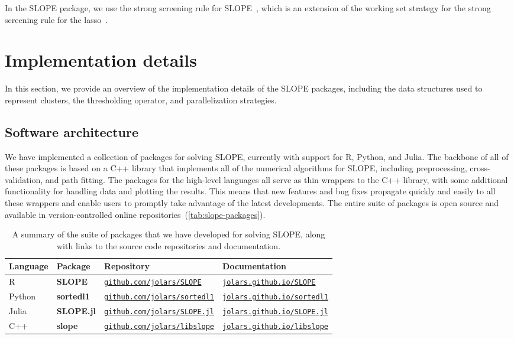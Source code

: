 \documentclass[a4paper,fleqn]{cas-sc}
\newcommand{\myurl}[1]{\href{https://#1}{\nolinkurl{#1}}}
\begin{document}
In the SLOPE package, we use the strong screening rule for
SLOPE~\citep{larsson2020a}, which is an extension of the working set strategy
for the strong screening rule for the lasso~\citep{tibshirani2012}.

\section{Implementation details}
\label{sec:implementation-details}

In this section, we provide an overview of the implementation details of the
SLOPE packages, including the data structures used to represent clusters, the
thresholding operator, and parallelization strategies.

\subsection{Software architecture}

We have implemented a collection of packages for solving SLOPE, currently with
support for \textsf{R}, \textsf{Python}, and \textsf{Julia}. The backbone of all
of these packages is based on a \textsf{C++} library that implements all of the
numerical algorithms for SLOPE, including preprocessing, cross-validation, and
path fitting. The packages for the high-level languages all serve as thin
wrappers to the \textsf{C++} library, with some additional functionality for
handling data and plotting the results. This means that new features and bug
fixes propagate quickly and easily to all these wrappers and enable users to
promptly take advantage of the latest developments. The entire suite of packages
is open source and available in version-controlled online
repositories~(\autoref{tab:slope-packages}).

\begin{table}[pos=tp]
  \caption{
    A summary of the suite of packages that we have developed for solving SLOPE,
    along with links to the source code repositories and documentation.
  }
  \label{tab:slope-packages}
  \centering
  \begin{tabular}{llll}
    \toprule
    Language        & Package           & Repository                         & Documentation                     \\
    \midrule
    \textsf{R}      & \textbf{SLOPE}    & \myurl{github.com/jolars/SLOPE}    & \myurl{jolars.github.io/SLOPE}    \\
    \textsf{Python} & \textbf{sortedl1} & \myurl{github.com/jolars/sortedl1} & \myurl{jolars.github.io/sortedl1} \\
    \textsf{Julia}  & \textbf{SLOPE.jl} & \myurl{github.com/jolars/SLOPE.jl} & \myurl{jolars.github.io/SLOPE.jl} \\
    \textsf{C++}    & \textbf{slope}    & \myurl{github.com/jolars/libslope} & \myurl{jolars.github.io/libslope} \\
    \bottomrule
  \end{tabular}
\end{table}
\end{document}
